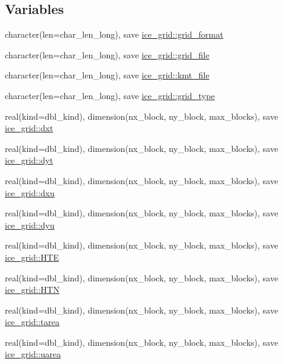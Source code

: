 \subsection*{Variables}
\begin{DoxyCompactItemize}
\item 
character(len=char\_\-len\_\-long), save \hyperlink{namespaceice__grid_af3bcebba9676775105d70d32996d3ce5}{ice\_\-grid::grid\_\-format}
\item 
character(len=char\_\-len\_\-long), save \hyperlink{namespaceice__grid_ac080d4ddf9dfc9375611416d1c425155}{ice\_\-grid::grid\_\-file}
\item 
character(len=char\_\-len\_\-long), save \hyperlink{namespaceice__grid_a21b896a78dcb089ba19cddd8a763ec94}{ice\_\-grid::kmt\_\-file}
\item 
character(len=char\_\-len\_\-long), save \hyperlink{namespaceice__grid_a927cd355e5ebbeb5b943262b4d8a1c74}{ice\_\-grid::grid\_\-type}
\item 
real(kind=dbl\_\-kind), dimension(nx\_\-block, ny\_\-block, max\_\-blocks), save \hyperlink{namespaceice__grid_a42016e793e21df58800428163f3eac13}{ice\_\-grid::dxt}
\item 
real(kind=dbl\_\-kind), dimension(nx\_\-block, ny\_\-block, max\_\-blocks), save \hyperlink{namespaceice__grid_ae46b1f5dbbef49a552a33a86b1f887b8}{ice\_\-grid::dyt}
\item 
real(kind=dbl\_\-kind), dimension(nx\_\-block, ny\_\-block, max\_\-blocks), save \hyperlink{namespaceice__grid_a9fecdcb5623bfc308ef4f2ddb4d284b6}{ice\_\-grid::dxu}
\item 
real(kind=dbl\_\-kind), dimension(nx\_\-block, ny\_\-block, max\_\-blocks), save \hyperlink{namespaceice__grid_ad2b38c10d13244b2b4da1e461c2ef207}{ice\_\-grid::dyu}
\item 
real(kind=dbl\_\-kind), dimension(nx\_\-block, ny\_\-block, max\_\-blocks), save \hyperlink{namespaceice__grid_a881253aa819ce18c46c4bffb3d558616}{ice\_\-grid::HTE}
\item 
real(kind=dbl\_\-kind), dimension(nx\_\-block, ny\_\-block, max\_\-blocks), save \hyperlink{namespaceice__grid_a6d5e0411ab66c52d72c0bcc75f794eab}{ice\_\-grid::HTN}
\item 
real(kind=dbl\_\-kind), dimension(nx\_\-block, ny\_\-block, max\_\-blocks), save \hyperlink{namespaceice__grid_af9d3e2476e44dd679c4062b370f21ffa}{ice\_\-grid::tarea}
\item 
real(kind=dbl\_\-kind), dimension(nx\_\-block, ny\_\-block, max\_\-blocks), save \hyperlink{namespaceice__grid_aa8008e6fedd2e53d57bee5d6fa898de9}{ice\_\-grid::uarea}

\end{DoxyCompactItemize}
